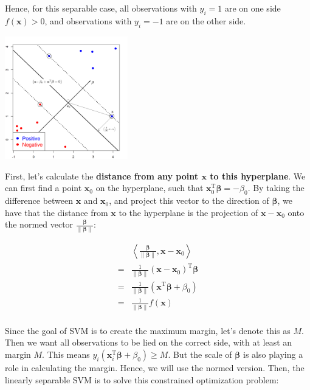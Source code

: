 \documentclass[
]{book}
\theoremstyle{definition}
\theoremstyle{definition}
\theoremstyle{definition}
\theoremstyle{definition}
\theoremstyle{remark}
\begin{document}
Hence, for this separable case, all observations with \(y_i = 1\) are on one side \(f(\mathbf{x}) > 0\), and observations with \(y_i = -1\) are on the other side.

\includegraphics[width=0.4\textwidth,height=\textheight]{images/SVMdist.png}

First, let's calculate the \textbf{distance from any point \(\mathbf{x}\) to this hyperplane}. We can first find a point \(\mathbf{x}_0\) on the hyperplane, such that \(\mathbf{x}_0^\text{T}\boldsymbol \beta= - \beta_0\). By taking the difference between \(\mathbf{x}\) and \(\mathbf{x}_0\), and project this vector to the direction of \(\boldsymbol \beta\), we have that the distance from \(\mathbf{x}\) to the hyperplane is the projection of \(\mathbf{x}- \mathbf{x}_0\) onto the normed vector \(\frac{\boldsymbol \beta}{\lVert \boldsymbol \beta\lVert}\):

\begin{align}
& \left \langle  \frac{\boldsymbol \beta}{\lVert \boldsymbol \beta\lVert}, \mathbf{x}- \mathbf{x}_0 \right \rangle \\
=& \frac{1}{\lVert \boldsymbol \beta\lVert} (\mathbf{x}- \mathbf{x}_0)^\text{T}\boldsymbol \beta\\
=& \frac{1}{\lVert \boldsymbol \beta\lVert} (\mathbf{x}^\text{T}\boldsymbol \beta+ \beta_0) \\
=& \frac{1}{\lVert \boldsymbol \beta\lVert} f(\mathbf{x}) \\
\end{align}

Since the goal of SVM is to create the maximum margin, let's denote this as \(M\). Then we want all observations to be lied on the correct side, with at least an margin \(M\). This means \(y_i (\mathbf{x}_i^\text{T}\boldsymbol \beta+ \beta_0) \geq M\). But the scale of \(\boldsymbol \beta\) is also playing a role in calculating the margin. Hence, we will use the normed version. Then, the linearly separable SVM is to solve this constrained optimization problem:
\end{document}
